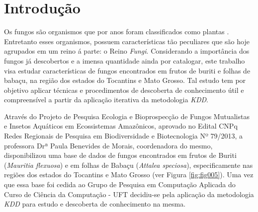 \documentclass[tcc2]{classe_uftex/uftex}
\begin{document}
  \begin{foreignabstract}
  \end{foreignabstract}
  \printlosymbols  
  \printloabbreviations
  \listoffigures
  \listoftables 
  \tableofcontents %
\mainmatter
\onehalfspacing


\chapter{Introdução}
\label{cap:introducao}
Os fungos são organismos que por anos foram classificados como plantas%
. Entretanto esses organismos, possuem características tão peculiares que são hoje agrupados em um reino á parte: o Reino \emph{Fungi}. Considerando a importância dos fungos já descobertos e a imensa quantidade ainda por catalogar, este trabalho visa estudar características de fungos encontrados em frutos de buriti e folhas de babaçu, na região dos estados do Tocantins e Mato Grosso. Tal estudo tem por objetivo aplicar técnicas e procedimentos de descoberta de conhecimento útil e compreensível a partir da aplicação iterativa da metodologia \emph{KDD}. %

Através do Projeto de Pesquisa Ecologia e Bioprospecção de Fungos Mutualistas e Insetos Aquáticos em Ecossistemas Amazônicos, aprovado no Edital CNPq Redes Regionais de Pesquisa em Biodiversidade e Biotecnologia Nº 79/2013, a professora Drª Paula Benevides de Morais, coordenadora do mesmo, disponibilizou uma base de dados de fungos encontrados em frutos de Buriti (\emph{Mauritia flexuosa}) e em folhas de Babaçu (\emph{Attalea speciosa}), especificamente nas regiões dos estados do Tocantins e Mato Grosso (ver Figura \ref{fig:fig005}). Uma vez que essa base foi cedida ao Grupo de Pesquisa em Computação Aplicada do Curso de Ciência da Computação - UFT decidiu-se pela aplicação da metodologia \emph{KDD} para estudo e descoberta de conhecimento na mesma.%
\end{document}
